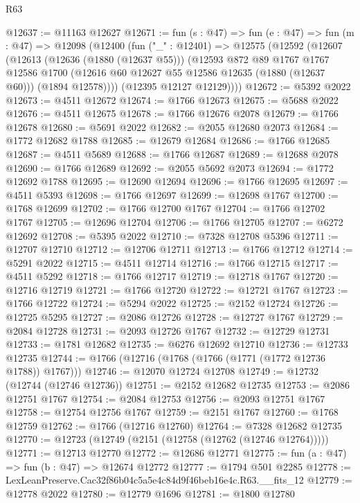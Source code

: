 \begin{lexlean}{R63}
\begin{coremodule}
@12637 := @11163 @12627
@12671 := fun (s : @47) =>
  fun (e : @47) =>
  fun (m : @47) =>
  @12098
    (@12400
      (fun ("_" : @12401) =>
      @12575
        (@12592
          (@12607
            (@12613
              (@12636 (@1880 (@12637 @55)))
              (@12593
                @872
                @89
                @1767
                @1767
                @12586
                @1700
                (@12616 @60 @12627 @55 @12586 @12635 (@1880 (@12637 @60)))
                (@1894 @12578))))
          (@12395 @12127 @12129))))
@12672 := @5392 @2022
@12673 := @4511 @12672
@12674 := @1766 @12673
@12675 := @5688 @2022
@12676 := @4511 @12675
@12678 := @1766 @12676 @2078
@12679 := @1766 @12678
@12680 := @5691 @2022
@12682 := @2055 @12680 @2073
@12684 := @1772 @12682 @1788
@12685 := @12679 @12684
@12686 := @1766 @12685
@12687 := @4511 @5689
@12688 := @1766 @12687
@12689 := @12688 @2078
@12690 := @1766 @12689
@12692 := @2055 @5692 @2073
@12694 := @1772 @12692 @1788
@12695 := @12690 @12694
@12696 := @1766 @12695
@12697 := @4511 @5393
@12698 := @1766 @12697
@12699 := @12698 @1767
@12700 := @1768 @12699
@12702 := @1766 @12700 @1767
@12704 := @1766 @12702 @1767
@12705 := @12696 @12704
@12706 := @1766 @12705
@12707 := @6272 @12692
@12708 := @5395 @2022
@12710 := @7328 @12708 @5396
@12711 := @12707 @12710
@12712 := @12706 @12711
@12713 := @1766 @12712
@12714 := @5291 @2022
@12715 := @4511 @12714
@12716 := @1766 @12715
@12717 := @4511 @5292
@12718 := @1766 @12717
@12719 := @12718 @1767
@12720 := @12716 @12719
@12721 := @1766 @12720
@12722 := @12721 @1767
@12723 := @1766 @12722
@12724 := @5294 @2022
@12725 := @2152 @12724
@12726 := @12725 @5295
@12727 := @2086 @12726
@12728 := @12727 @1767
@12729 := @2084 @12728
@12731 := @2093 @12726 @1767
@12732 := @12729 @12731
@12733 := @1781 @12682
@12735 := @6276 @12692 @12710
@12736 := @12733 @12735
@12744 := @1766 (@12716 (@1768 (@1766 (@1771 (@1772 @12736 @1788)) @1767)))
@12746 := @12070 @12724 @12708
@12749 := @12732 (@12744 (@12746 @12736))
@12751 := @2152 @12682 @12735
@12753 := @2086 @12751 @1767
@12754 := @2084 @12753
@12756 := @2093 @12751 @1767
@12758 := @12754 @12756 @1767
@12759 := @2151 @1767
@12760 := @1768 @12759
@12762 := @1766 (@12716 @12760)
@12764 := @7328 @12682 @12735
@12770 := @12723 (@12749 (@2151 (@12758 (@12762 (@12746 @12764)))))
@12771 := @12713 @12770
@12772 := @12686 @12771
@12775 := fun (a : @47) => fun (b : @47) => @12674 @12772
@12777 := @1794 @501 @2285
@12778 := LexLeanPreserve.Cac32f86b04c5a5e4c84d9f46beb16e4c.R63.__fits_12
@12779 := @12778 @2022
@12780 := @12779 @1696
@12781 := @1800 @12780

\end{coremodule}
\end{lexlean}
